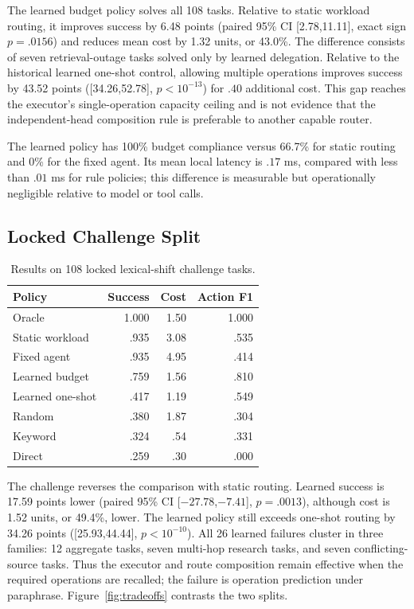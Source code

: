 \documentclass[letterpaper]{article} %
\begin{document}
The learned budget policy solves all 108 tasks. Relative to static workload routing, it improves success by 6.48 points (paired 95\% CI [2.78,11.11], exact sign $p=.0156$) and reduces mean cost by 1.32 units, or 43.0\%. The difference consists of seven retrieval-outage tasks solved only by learned delegation. Relative to the historical learned one-shot control, allowing multiple operations improves success by 43.52 points ([34.26,52.78], $p<10^{-13}$) for $.40$ additional cost. This gap reaches the executor's single-operation capacity ceiling and is not evidence that the independent-head composition rule is preferable to another capable router.

The learned policy has 100\% budget compliance versus 66.7\% for static routing and 0\% for the fixed agent. Its mean local latency is $.17$ ms, compared with less than $.01$ ms for rule policies; this difference is measurable but operationally negligible relative to model or tool calls.

\subsection{Locked Challenge Split}

\begin{table}[t]
\centering
\small
\caption{Results on 108 locked lexical-shift challenge tasks.}
\label{tab:challenge}
\begin{tabular}{lrrr}
\toprule
Policy & Success & Cost & Action F1 \\
\midrule
Oracle & 1.000 & 1.50 & 1.000 \\
Static workload & .935 & 3.08 & .535 \\
Fixed agent & .935 & 4.95 & .414 \\
Learned budget & .759 & 1.56 & .810 \\
Learned one-shot & .417 & 1.19 & .549 \\
Random & .380 & 1.87 & .304 \\
Keyword & .324 & .54 & .331 \\
Direct & .259 & .30 & .000 \\
\bottomrule
\end{tabular}
\end{table}

The challenge reverses the comparison with static routing. Learned success is 17.59 points lower (paired 95\% CI [$-27.78$,$-7.41$], $p=.0013$), although cost is 1.52 units, or 49.4\%, lower. The learned policy still exceeds one-shot routing by 34.26 points ([25.93,44.44], $p<10^{-10}$). All 26 learned failures cluster in three families: 12 aggregate tasks, seven multi-hop research tasks, and seven conflicting-source tasks. Thus the executor and route composition remain effective when the required operations are recalled; the failure is operation prediction under paraphrase. Figure~\ref{fig:tradeoffs} contrasts the two splits.
\end{document}
